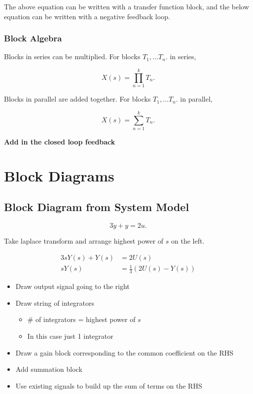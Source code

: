 \documentclass[12pt, a4paper]{report}
\begin{document}
  The above equation can be written with a transfer function block, and the below equation can be written with a negative feedback loop.

  \subsection{Block Algebra}

  Blocks in series can be multiplied. For blocks $ T_1, \ldots T_n. $ in series,

  \[
      X(s) = \prod_{n=1}^{k} T_n
    .\]

  Blocks in parallel are added together. For blocks $ T_1, \ldots T_n. $ in parallel,

  \[
      X(s) = \sum_{n=1}^{k} T_n
    .\]

  \textbf{Add in the closed loop feedback}






  \chapter{Block Diagrams}

  \section{Block Diagram from System Model}

  \[
      3 \dot y + y = 2u
    .\]

  Take laplace transform and arrange highest power of $ s $ on the left.

  \begin{align}
    3sY(s) + Y(s) &= 2U(s) \\
    sY(s) &= \frac{1}{3} \left( 2U(s) - Y(s) \right)
  \end{align}

  \begin{itemize}
    \item Draw output signal going to the right
    \item Draw string of integrators
    \begin{itemize}
      \item \# of integrators = highest power of $ s $
      \item In this case just 1 integrator
    \end{itemize}
    \item Draw a gain block corresponding to the common coefficient on the RHS
    \item Add summation block
    \item Use existing signals to build up the sum of terms on the RHS
  \end{itemize}
\end{document}
